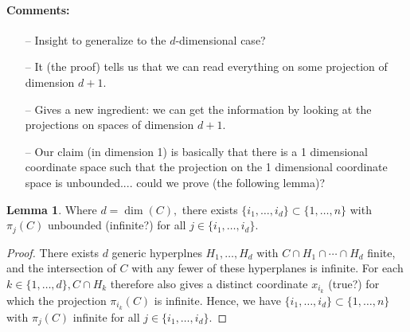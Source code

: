 \documentclass[11pt]{article}
\theoremstyle{definition}
\newtheorem{lemma}{Lemma}
\begin{document}
\paragraph*{Comments:}
\begin{itemize}
    \item[--] Insight to generalize to the $d$-dimensional case? 
    \item[--] It (the proof) tells us that we can read everything on some projection of dimension $d+1$.
    \item[--] Gives a new ingredient: we can get the information by looking at the projections on spaces of dimension $d+1.$ 
    \item[--] Our claim (in dimension 1) is basically that there is a 1 dimensional coordinate space such that the projection on the 1 dimensional coordinate space is unbounded.... could we prove (the following lemma)?
\end{itemize}



\begin{lemma}
    Where $d = \dim (C),$ there exists $\{i_1,\hdots,i_d\} \subset \{1,\hdots,n\}$ with $\pi_j(C)$ unbounded (infinite?) for all $j \in \{i_1,\hdots,i_d\}.$
\end{lemma}
\begin{proof}
    There exists $d$ generic hyperplnes $H_1,\hdots,H_d$ with $C \cap H_1 \cap \cdots \cap H_d$ finite, and the intersection of $C$ with any fewer of these hyperplanes is infinite. For each $k \in \{1,\hdots,d\}, C \cap H_k$ therefore also gives a distinct coordinate $x_{i_k}$ \color{red} (true?) \color{black} for which the projection $\pi_{i_k}(C)$ is infinite. Hence, we have $\{i_1,\hdots,i_d\} \subset \{1,\hdots,n\}$ with $\pi_j(C)$ infinite for all $j \in \{i_1,\hdots,i_d\}.$
\end{proof}
\end{document}
